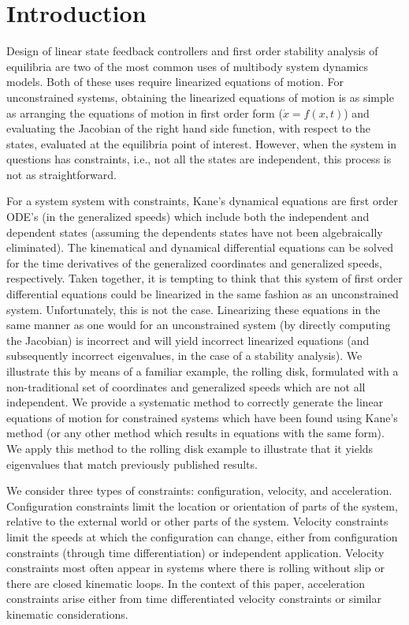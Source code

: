 \documentclass[smallcondensed,final]{svjour3}                     %
\begin{document}
\section{Introduction}
\label{sec:intro}
Design of linear state feedback controllers and first order stability analysis
of equilibria are two of the most common uses of multibody system dynamics
models. Both of these uses require linearized equations of motion. For
unconstrained systems, obtaining the linearized equations of motion is as
simple as arranging the equations of motion in first order form ($\dot{x} =
f(x, t)$) and evaluating the Jacobian of the right hand side function, with
respect to the states, evaluated at the equilibria point of interest.  However,
when the system in questions has constraints, i.e., not all the states are
independent, this process is not as straightforward.

For a system system with constraints, Kane's dynamical equations\cite{Kane1985}
are first order ODE's (in the generalized speeds) which include both the
independent and dependent states (assuming the dependents states have not been
algebraically eliminated). The kinematical and dynamical differential equations
can be solved for the time derivatives of the generalized coordinates and
generalized speeds, respectively. Taken together, it is tempting to think that
this system of first order differential equations could be linearized in the
same fashion as an unconstrained system.  Unfortunately, this is not the case.
Linearizing these equations in the same manner as one would for an
unconstrained system (by directly computing the Jacobian) is incorrect and will
yield incorrect linearized equations (and subsequently incorrect eigenvalues,
in the case of a stability analysis). We illustrate this by means of a familiar
example, the rolling disk, formulated with a non-traditional set of coordinates
and generalized speeds which are not all independent. We provide a systematic
method to correctly generate the linear equations of motion for constrained
systems which have been found using Kane's method (or any other method which
results in equations with the same form). We apply this method to the rolling
disk example to illustrate that it yields eigenvalues that match previously
published results.

We consider three types of constraints: configuration, velocity, and
acceleration. Configuration constraints limit the location or orientation of
parts of the system, relative to the external world or other parts of the
system. Velocity constraints limit the speeds at which the configuration can
change, either from configuration constraints (through time differentiation) or
independent application. Velocity constraints most often appear in systems
where there is rolling without slip or there are closed kinematic loops. In the
context of this paper, acceleration constraints arise either from time
differentiated velocity constraints or similar kinematic considerations.
\end{document}
